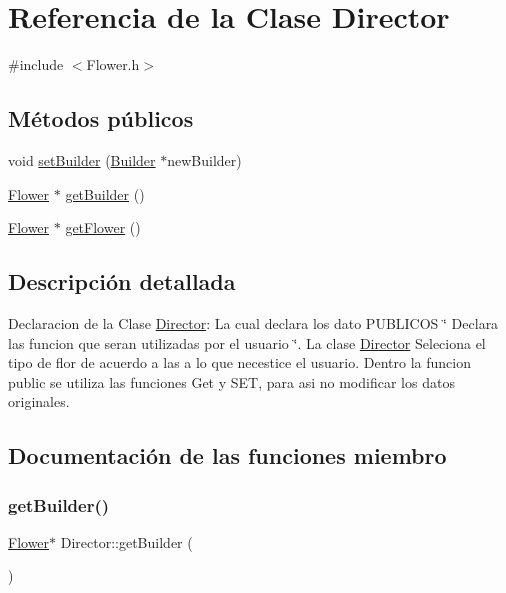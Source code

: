 \hypertarget{class_director}{}\section{Referencia de la Clase Director}
\label{class_director}


{\ttfamily \#include $<$Flower.\+h$>$}

\subsection*{Métodos públicos}
\begin{DoxyCompactItemize}
\item 
void \mbox{\hyperlink{class_director_aa266ee3382d3bb30df71951ba0976ae4}{set\+Builder}} (\mbox{\hyperlink{class_builder}{Builder}} $\ast$new\+Builder)
\item 
\mbox{\hyperlink{class_flower}{Flower}} $\ast$ \mbox{\hyperlink{class_director_ae82a354f701f53efd4fc164147d4d8e7}{get\+Builder}} ()
\item 
\mbox{\hyperlink{class_flower}{Flower}} $\ast$ \mbox{\hyperlink{class_director_a0db8afee3630637eee63370a9de4dc3a}{get\+Flower}} ()
\end{DoxyCompactItemize}


\subsection{Descripción detallada}
Declaracion de la Clase \mbox{\hyperlink{class_director}{Director}}\+: La cual declara los dato P\+U\+B\+L\+I\+C\+OS \char`\"{} Declara las funcion que seran utilizadas por el usuario \char`\"{}. La clase \mbox{\hyperlink{class_director}{Director}} Seleciona el tipo de flor de acuerdo a las a lo que necestice el usuario. Dentro la funcion public se utiliza las funciones Get y S\+ET, para asi no modificar los datos originales. 

\subsection{Documentación de las funciones miembro}
\mbox{\label{class_director_ae82a354f701f53efd4fc164147d4d8e7}} 
\subsubsection{\texorpdfstring{getBuilder()}{getBuilder()}}
{\footnotesize\ttfamily \mbox{\hyperlink{class_flower}{Flower}}$\ast$ Director\+::get\+Builder (\begin{DoxyParamCaption}{ }\end{DoxyParamCaption})\hspace{0.3cm}{\ttfamily [inline]}}

